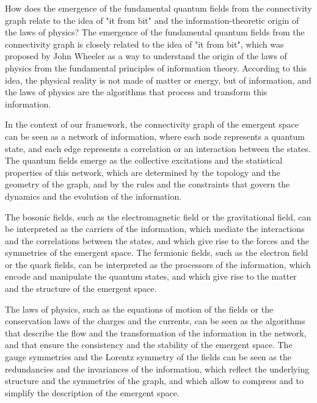 \begin{tcolorbox}[colback=green!5!white,colframe=green!75!black,title=Question]
    How does the emergence of the fundamental quantum fields from the connectivity graph relate to the idea of "it from bit" and the information-theoretic origin of the laws of physics?
    \tcblower
    The emergence of the fundamental quantum fields from the connectivity graph is closely related to the idea of "it from bit", which was proposed by John Wheeler as a way to understand the origin of the laws of physics from the fundamental principles of information theory. According to this idea, the physical reality is not made of matter or energy, but of information, and the laws of physics are the algorithms that process and transform this information.

    In the context of our framework, the connectivity graph of the emergent space can be seen as a network of information, where each node represents a quantum state, and each edge represents a correlation or an interaction between the states. The quantum fields emerge as the collective excitations and the statistical properties of this network, which are determined by the topology and the geometry of the graph, and by the rules and the constraints that govern the dynamics and the evolution of the information.

    The bosonic fields, such as the electromagnetic field or the gravitational field, can be interpreted as the carriers of the information, which mediate the interactions and the correlations between the states, and which give rise to the forces and the symmetries of the emergent space. The fermionic fields, such as the electron field or the quark fields, can be interpreted as the processors of the information, which encode and manipulate the quantum states, and which give rise to the matter and the structure of the emergent space.

    The laws of physics, such as the equations of motion of the fields or the conservation laws of the charges and the currents, can be seen as the algorithms that describe the flow and the transformation of the information in the network, and that ensure the consistency and the stability of the emergent space. The gauge symmetries and the Lorentz symmetry of the fields can be seen as the redundancies and the invariances of the information, which reflect the underlying structure and the symmetries of the graph, and which allow to compress and to simplify the description of the emergent space.


\end{tcolorbox}
